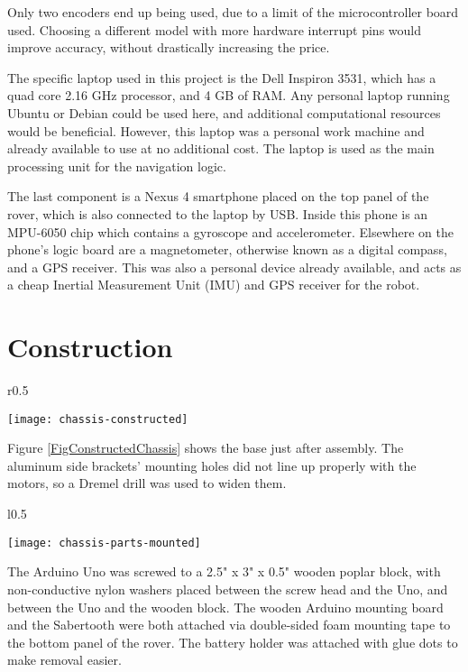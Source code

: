 Only two encoders end up being used, due to a limit of the microcontroller board used. Choosing a different model with more hardware interrupt pins would improve accuracy, without drastically increasing the price.

The specific laptop used in this project is the Dell Inspiron 3531, which has a quad core 2.16 GHz processor, and 4 GB of RAM. Any personal laptop running Ubuntu or Debian could be used here, and additional computational resources would be beneficial. However, this laptop was a personal work machine and already available to use at no additional cost. The laptop is used as the main processing unit for the navigation logic.

The last component is a Nexus 4 smartphone placed on the top panel of the rover, which is also connected to the laptop by USB. Inside this phone is an MPU-6050 chip which contains a gyroscope and accelerometer. Elsewhere on the phone's logic board are a magnetometer, otherwise known as a digital compass, and a GPS receiver. This was also a personal device already available, and acts as a cheap Inertial Measurement Unit (IMU) and GPS receiver for the robot.

\section{Construction}

\begin{wrapfigure}{r}{0.5\textwidth}
	\caption{Constructed Chassis}
	\centering
	\texttt{[image: chassis-constructed]}
	\label{FigConstructedChassis}
\end{wrapfigure}

Figure \ref{FigConstructedChassis} shows the base just after assembly. The aluminum side brackets' mounting holes did not line up properly with the motors, so a Dremel drill was used to widen them.

\begin{wrapfigure}{l}{0.5\textwidth}
	\caption{Pieces Mounted}
	\centering
	\texttt{[image: chassis-parts-mounted]}
	\label{FigChassisParts}
\end{wrapfigure}

The Arduino Uno was screwed to a 2.5" x 3" x 0.5" wooden poplar block, with non-conductive nylon washers placed between the screw head and the Uno, and between the Uno and the wooden block. The wooden Arduino mounting board and the Sabertooth were both attached via double-sided foam mounting tape to the bottom panel of the rover. The battery holder was attached with glue dots to make removal easier.

